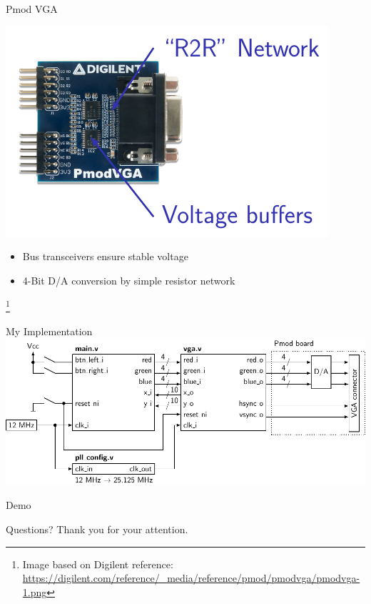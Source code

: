 \documentclass{beamer}
\begin{document}
\begin{frame}{Pmod VGA}
	\begin{minipage}{0.66\textwidth}
		\includegraphics[width=\textwidth]{../figures/pmod-figure0.pdf}
	\end{minipage}
	\begin{minipage}{0.32\textwidth}
		\begin{itemize}
			\item Bus transceivers ensure stable voltage 
			\item 4-Bit D/A conversion by simple resistor network
		\end{itemize}
	\end{minipage}
	\footnote{Image based on Digilent reference:
	\url{https://digilent.com/reference/_media/reference/pmod/pmodvga/pmodvga-1.png}}
\end{frame}

\begin{frame}{My Implementation}
	\includegraphics[width=\textwidth]{../figures/diagram-figure0.pdf}
\end{frame}

\begin{frame}{Demo}
\end{frame}

\begin{frame}{Questions?}
Thank you for your attention.
\end{frame}
\end{document}

